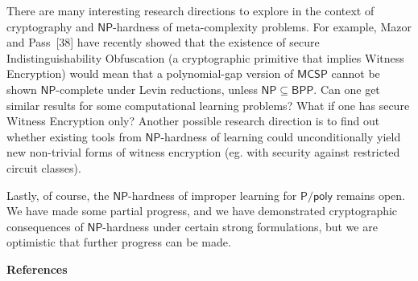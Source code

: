 There are many interesting research directions to explore in the context of cryptography and ${\mathsf{NP}}$-hardness of meta-complexity problems. For example,
Mazor and Pass [38] have recently showed that the existence of secure Indistinguishability Obfuscation (a cryptographic primitive that implies Witness Encryption) would mean that a polynomial-gap version of ${\mathsf{MCSP}}$ cannot be shown ${\mathsf{NP}}$-complete under Levin reductions, unless ${\mathsf{NP}}\subseteq{\mathsf{BPP}}$. Can one get similar results for some computational learning problems? What if one has secure Witness Encryption only? Another possible research direction is to find out whether existing tools from ${\mathsf{NP}}$-hardness of learning could unconditionally yield new non-trivial forms of witness encryption (eg. with security against restricted circuit classes).\par




Lastly, of course, the ${\mathsf{NP}}$-hardness of improper learning for ${\mathsf{P}}/{\mathsf{poly}}$ remains open. We have made some partial progress, and we have demonstrated cryptographic consequences of ${\mathsf{NP}}$-hardness under certain strong formulations, but we are optimistic that further progress can be made.\par





\par\medskip\noindent\textbf{References}\par



